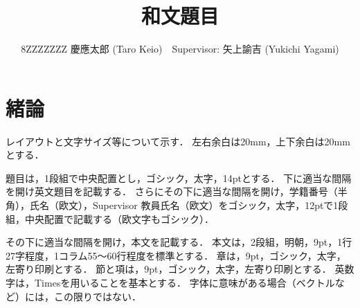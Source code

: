 ﻿\documentclass[twocolumn,9pt]{ltjsarticle}
\title{和文題目}
\author{8ZZZZZZZ 慶應太郎 (Taro Keio)　Supervisor: 矢上諭吉 (Yukichi Yagami)}
\begin{document}
\maketitle
\section{緒論}
レイアウトと文字サイズ等について示す．
左右余白は20mm，上下余白は20mmとする．

題目は，1段組で中央配置とし，ゴシック，太字，14ptとする．
下に適当な間隔を開け英文題目を記載する．
さらにその下に適当な間隔を開け，学籍番号（半角），氏名（欧文），Supervisor 教員氏名（欧文）をゴシック，太字，12ptで1段組，中央配置で記載する（欧文字もゴシック）．

その下に適当な間隔を開け，本文を記載する．
本文は，2段組，明朝，9pt，1行27字程度，1コラム55～60行程度を標準とする．
章は，9pt，ゴシック，太字，左寄り印刷とする．
節と項は，9pt，ゴシック，太字，左寄り印刷とする．
英数字は，Timesを用いることを基本とする．
字体に意味がある場合（ベクトルなど）には，この限りではない．
\end{document}

